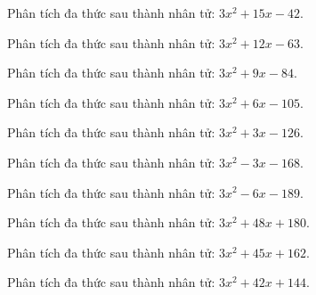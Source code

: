 \begin{bt}
	Phân tích đa thức sau thành nhân tử: $3 x^2 + 15 x - 42$.
\end{bt}
\begin{bt}
	Phân tích đa thức sau thành nhân tử: $3 x^2 + 12 x - 63$.
\end{bt}
\begin{bt}
	Phân tích đa thức sau thành nhân tử: $3 x^2 + 9 x - 84$.
\end{bt}
\begin{bt}
	Phân tích đa thức sau thành nhân tử: $3 x^2 + 6 x - 105$.
\end{bt}
\begin{bt}
	Phân tích đa thức sau thành nhân tử: $3 x^2 + 3 x - 126$.
\end{bt}
\begin{bt}
	Phân tích đa thức sau thành nhân tử: $3 x^2 - 3 x - 168$.
\end{bt}
\begin{bt}
	Phân tích đa thức sau thành nhân tử: $3 x^2 - 6 x - 189$.
\end{bt}
\begin{bt}
	Phân tích đa thức sau thành nhân tử: $3 x^2 + 48 x + 180$.
\end{bt}
\begin{bt}
	Phân tích đa thức sau thành nhân tử: $3 x^2 + 45 x + 162$.
\end{bt}
\begin{bt}
	Phân tích đa thức sau thành nhân tử: $3 x^2 + 42 x + 144$.
\end{bt}
